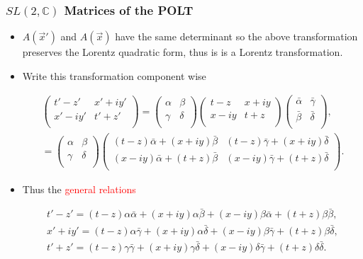 \documentclass[10pt,a4paper]{beamer}
\begin{document}
\begin{frame}
\frametitle{$SL(2,\mathbb{C})$ Matrices of the POLT}
\begin{itemize}
\item<1->{$A(\vec{x}')$ and $A(\vec{x})$ have the same determinant so the above transformation preserves the Lorentz quadratic form, thus is is a Lorentz transformation.}
\item<2->{Write this transformation component wise

\begin{gather*} 
\left(
\begin{array}{cc}
t' - z' & x' + i y' \\
x' - i y' & t' + z' \\
\end{array}
\right)
=
\left(
\begin{array}{cc}
\alpha & \beta \\
\gamma & \delta \\
\end{array}
\right)
\left(
\begin{array}{cc}
t-z & x + i y \\
x - i y & t + z   \\
\end{array}
\right)
\left(
\begin{array}{cc}
\bar{\alpha} & \bar{\gamma} \\
\bar{\beta} & \bar{\delta} \\
\end{array}
\right), \\
 = \left(
\begin{array}{cc}
\alpha & \beta \\
\gamma & \delta \\
\end{array}
\right)
\left(
\begin{array}{cc}
(t-z)\bar{\alpha} + (x + iy)\bar{\beta} & (t-z)\bar{\gamma} + (x + iy)\bar{\delta} \\
(x - iy)\bar{\alpha} + (t+z)\bar{\beta} & (x-iy)\bar{\gamma} + (t+z)\bar{\delta} \\
\end{array}
\right).
\end{gather*}

}

\item<3->{Thus the \textcolor{red}{general relations}

\begin{gather*}
t' - z'  = (t-z)\alpha\bar{\alpha} + (x + iy)\alpha\bar{\beta} + (x - iy)\beta\bar{\alpha} + (t+z)\beta\bar{\beta},
\\
x' + iy'  = (t-z)\alpha\bar{\gamma} + (x + iy)\alpha\bar{\delta} + (x-iy)\beta\bar{\gamma} + (t+z)\beta\bar{\delta},
\\
t' + z'  = (t-z)\gamma\bar{\gamma} + (x + iy)\gamma\bar{\delta} + (x-iy)\delta\bar{\gamma} + (t+z)\delta\bar{\delta}.
\end{gather*}
}
\end{itemize}



\end{frame}
\end{document}
